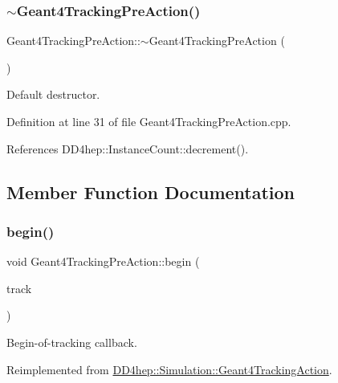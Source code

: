 \subsubsection{\texorpdfstring{$\sim$\+Geant4\+Tracking\+Pre\+Action()}{~Geant4TrackingPreAction()}}
{\footnotesize\ttfamily Geant4\+Tracking\+Pre\+Action\+::$\sim$\+Geant4\+Tracking\+Pre\+Action (\begin{DoxyParamCaption}{ }\end{DoxyParamCaption})\hspace{0.3cm}{\ttfamily [virtual]}}



Default destructor. 



Definition at line 31 of file Geant4\+Tracking\+Pre\+Action.\+cpp.



References D\+D4hep\+::\+Instance\+Count\+::decrement().



\subsection{Member Function Documentation}
\hypertarget{class_d_d4hep_1_1_simulation_1_1_geant4_tracking_pre_action_a1a4535994e5225ef10c47164a21deb92}{}\label{class_d_d4hep_1_1_simulation_1_1_geant4_tracking_pre_action_a1a4535994e5225ef10c47164a21deb92} 
\subsubsection{\texorpdfstring{begin()}{begin()}}
{\footnotesize\ttfamily void Geant4\+Tracking\+Pre\+Action\+::begin (\begin{DoxyParamCaption}\item[{const G4\+Track $\ast$}]{track }\end{DoxyParamCaption})\hspace{0.3cm}{\ttfamily [virtual]}}



Begin-\/of-\/tracking callback. 



Reimplemented from \hyperlink{class_d_d4hep_1_1_simulation_1_1_geant4_tracking_action_a65858867a7b71bf4f48b9f140bc9a88d}{D\+D4hep\+::\+Simulation\+::\+Geant4\+Tracking\+Action}.



